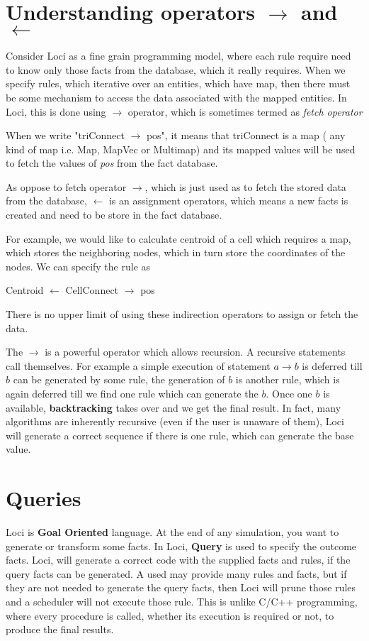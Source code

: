 \section { Understanding operators $\rightarrow$ and $\leftarrow$ }
Consider Loci as a fine grain programming model, where each rule require need to 
know only those facts from the database, which it really requires. When we specify
rules, which iterative over an entities, which have map, then there must be 
some mechanism to access the data associated with the mapped entities. In Loci,
this is done using $\rightarrow$ operator, which is sometimes termed as {\em fetch
operator}

\par When we write "triConnect $\rightarrow$ pos", it means that triConnect is a map (
any kind of map i.e. Map, MapVec or Multimap) and its mapped values will be used
to fetch the values of {\em pos} from the fact database.

As oppose to fetch operator $\rightarrow$, which is just used as to fetch the 
stored data from the database, $\leftarrow$ is an assignment operators, which
means a new facts is created and need to be store in the fact database. 
\par For example, we would like to calculate centroid of a cell which 
requires a map, which stores the neighboring nodes, which in turn store the
coordinates of the nodes. We can specify the rule as
\begin{center}
Centroid $\leftarrow$ CellConnect $\rightarrow$ pos
\end{center}

There is no upper limit of using these indirection operators to assign or 
fetch the data.

The $\rightarrow$ is a powerful operator which allows recursion. A recursive
statements call themselves. For example a simple execution of statement 
$ a \rightarrow b$ is deferred till $b$ can be generated by some rule, the
generation of $b$ is another rule, which is again deferred till we find
one rule which can generate the $b$. Once one $b$ is available, {\bf backtracking}
takes over and we get the final result. In fact, many algorithms are inherently
recursive (even if the user is unaware of them), Loci will generate a correct
sequence if there is one rule, which can generate the base value.

\section { Queries }
Loci is {\bf Goal Oriented } language. At the end of any simulation, you want to
generate or transform some facts. In Loci, {\bf Query} is used to specify the outcome
facts. Loci, will generate a correct code with the supplied facts and rules, if
the query facts can be generated. A used may provide many rules and facts, but if 
they are not needed to generate the query facts, then Loci
will prune those rules and a scheduler will not execute those rule. This is unlike
C/C++ programming, where every procedure is called, whether its execution is 
required or not, to produce the final results.
